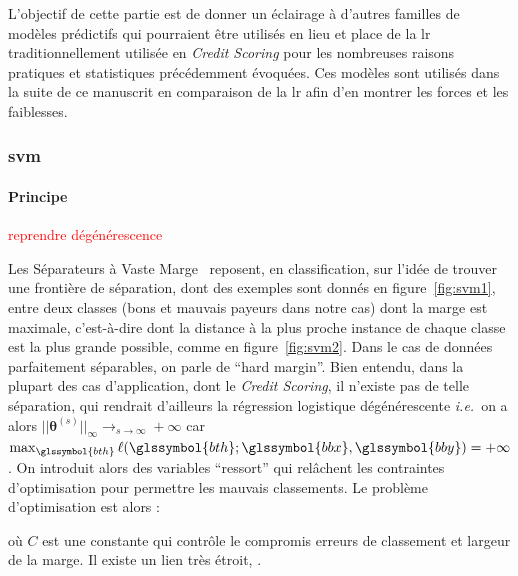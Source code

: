 L'objectif de cette partie est de donner un éclairage à d'autres familles de modèles prédictifs qui pourraient être utilisés en lieu et place de la \gls{lr} traditionnellement utilisée en \textit{Credit Scoring} pour les nombreuses raisons pratiques et statistiques précédemment évoquées. Ces modèles sont utilisés dans la suite de ce manuscrit en comparaison de la \gls{lr} afin d'en montrer les forces et les faiblesses.

\subsubsection{\Gls{svm}}

\paragraph{Principe}

\textcolor{red}{reprendre dégénérescence}

Les Séparateurs à Vaste Marge~\cite{vapnik2013nature} reposent, en classification, sur l'idée de trouver une frontière de séparation, dont des exemples sont donnés en figure~\ref{fig:svm1}, entre deux classes (bons et mauvais payeurs dans notre cas) dont la marge est maximale, c'est-à-dire dont la distance à la plus proche instance de chaque classe est la plus grande possible, comme en figure~\ref{fig:svm2}. Dans le cas de données parfaitement séparables, on parle de ``hard margin''. Bien entendu, dans la plupart des cas d'application, dont le \textit{Credit Scoring}, il n'existe pas de telle séparation, qui rendrait d'ailleurs la régression logistique dégénérescente \textit{i.e.}\ on a alors $||\bm{\theta}^{(s)}||_{\infty} \to_{s \to \infty} +\infty$ car $\max_{\glssymbol{bth}} \ell(\glssymbol{bth};\glssymbol{bbx},\glssymbol{bby}) = + \infty$. On introduit alors des variables ``ressort'' qui relâchent les contraintes d'optimisation pour permettre les mauvais classements. Le problème d'optimisation est alors :

où $C$ est une constante qui contrôle le compromis erreurs de classement et largeur de la marge. Il existe un lien très étroit, .


